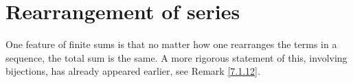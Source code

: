 \section{Rearrangement of series}\label{sec 7.4}

\begin{note}
One feature of finite sums is that no matter how one rearranges the terms in a sequence, the total sum is the same.
A more rigorous statement of this, involving bijections, has already appeared earlier, see Remark \ref{7.1.12}.
\end{note}